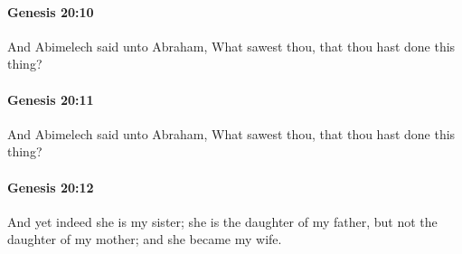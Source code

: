 		\paragraph{Genesis 20:10} %
			\label{GENESIS-20-10}

			And Abimelech said unto Abraham, What sawest thou, that thou hast done this thing?


		\paragraph{Genesis 20:11} %
			\label{GENESIS-20-11}

			And Abimelech said unto Abraham, What sawest thou, that thou hast done this thing?


		\paragraph{Genesis 20:12} %
			\label{GENESIS-20-12}

			And yet indeed she is my sister; she is the daughter of my father, but not the daughter of my mother; and she became my wife.


